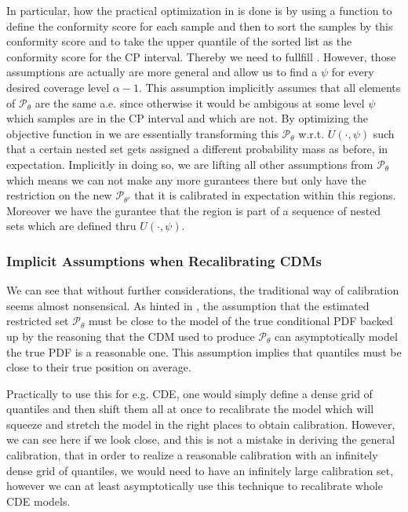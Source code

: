 In particular, how the practical optimization in  is done is by using a function to define the conformity score for each sample and then to sort the samples by this conformity score and to take the upper quantile of the sorted list as the conformity score for the CP interval. Thereby we need to fullfill . However, those assumptions are actually are more general and allow us to find a $\psi$ for every desired coverage level $\alpha - 1$. This assumption implicitly assumes that all elements of $\mathscr{P}_{\theta}$ are the same a.e. since otherwise it would be ambigous at some level $\psi$ which samples are in the CP interval and which are not. By optimizing the objective function in  we are essentially transforming this $\mathscr{P}_{\theta}$ w.r.t. $U(\cdot, \psi)$ such that a certain nested set gets assigned a different probability mass as before, in expectation. Implicitly in doing so, we are lifting all other assumptions from $\mathscr{P}_{\theta}$ which means we can not make any more gurantees there but only have the restriction on the new $\mathscr{P}_{\theta'}$ that it is calibrated in expectation within this regions. Moreover we have the gurantee that the region is part of a sequence of nested sets which are defined thru $U(\cdot, \psi)$.

\subsubsection{Implicit Assumptions when Recalibrating CDMs}
We can see that without further considerations, the traditional way of calibration seems almost nonsensical. As hinted in , the assumption that the estimated restricted set $\mathscr{P}_\theta$ must be close to the model of the true conditional PDF backed up by the reasoning that the CDM used to produce $\mathscr{P}_{\theta}$ can asymptotically model the true PDF is a reasonable one. This assumption implies that quantiles must be close to their true position on average.

Practically to use this for e.g. CDE, one would simply define a dense grid of quantiles and then shift them all at once to recalibrate the model which will squeeze and stretch the model in the right places to obtain calibration. However, we can see here if we look close, and this is not a mistake in deriving the general calibration, that in order to realize a reasonable calibration with an infinitely dense grid of quantiles, we would need to have an infinitely large calibration set, however we can at least asymptotically use this technique to recalibrate whole CDE models.

